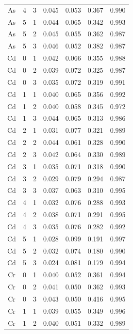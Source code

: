 \documentclass[ms, hidelinks]{uncgdissertationexp3}
\theoremstyle{plain}
\theoremstyle{definition}
\theoremstyle{remark}
\begin{document}
\begin{longtable}{ccccccc}
  \rowcolor{gray!6}  As & 4 & 3 & 0.045 & 0.053 & 0.367 & 0.990\\
  As & 5 & 1 & 0.044 & 0.065 & 0.342 & 0.993\\
  \rowcolor{gray!6}  As & 5 & 2 & 0.045 & 0.055 & 0.362 & 0.987\\
  As & 5 & 3 & 0.046 & 0.052 & 0.382 & 0.987\\
  \rowcolor{gray!6}  Cd & 0 & 1 & 0.042 & 0.066 & 0.355 & 0.988\\
  Cd & 0 & 2 & 0.039 & 0.072 & 0.325 & 0.987\\
  \rowcolor{gray!6}  Cd & 0 & 3 & 0.035 & 0.072 & 0.319 & 0.991\\
  Cd & 1 & 1 & 0.040 & 0.065 & 0.356 & 0.992\\
  \rowcolor{gray!6}  Cd & 1 & 2 & 0.040 & 0.058 & 0.345 & 0.972\\
  Cd & 1 & 3 & 0.044 & 0.065 & 0.313 & 0.986\\
  \rowcolor{gray!6}  Cd & 2 & 1 & 0.031 & 0.077 & 0.321 & 0.989\\
  Cd & 2 & 2 & 0.044 & 0.061 & 0.328 & 0.990\\
  \rowcolor{gray!6}  Cd & 2 & 3 & 0.042 & 0.064 & 0.330 & 0.989\\
  Cd & 3 & 1 & 0.035 & 0.071 & 0.318 & 0.990\\
  \rowcolor{gray!6}  Cd & 3 & 2 & 0.029 & 0.079 & 0.294 & 0.987\\
  Cd & 3 & 3 & 0.037 & 0.063 & 0.310 & 0.995\\
  \rowcolor{gray!6}  Cd & 4 & 1 & 0.032 & 0.076 & 0.288 & 0.993\\
  Cd & 4 & 2 & 0.038 & 0.071 & 0.291 & 0.995\\
  \rowcolor{gray!6}  Cd & 4 & 3 & 0.035 & 0.076 & 0.282 & 0.992\\
  Cd & 5 & 1 & 0.028 & 0.099 & 0.191 & 0.997\\
  \rowcolor{gray!6}  Cd & 5 & 2 & 0.032 & 0.074 & 0.180 & 0.990\\
  Cd & 5 & 3 & 0.024 & 0.081 & 0.179 & 0.994\\
  \rowcolor{gray!6}  Cr & 0 & 1 & 0.040 & 0.052 & 0.361 & 0.994\\
  Cr & 0 & 2 & 0.041 & 0.050 & 0.362 & 0.993\\
  \rowcolor{gray!6}  Cr & 0 & 3 & 0.043 & 0.050 & 0.416 & 0.995\\
  Cr & 1 & 1 & 0.039 & 0.055 & 0.349 & 0.996\\
  \rowcolor{gray!6}  Cr & 1 & 2 & 0.040 & 0.051 & 0.332 & 0.989\\

\end{longtable}
\end{document}
